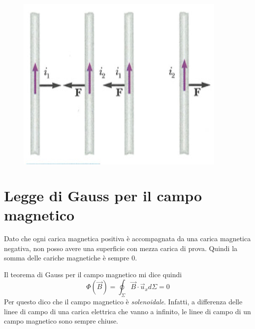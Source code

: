 \documentclass[class=book, crop=false, oneside, 12pt]{standalone}
\begin{document}
\begin{figure}[h]
    \includegraphics[scale=0.4]{int_cavi.png}
    \centering
    \caption{}
\end{figure}

\section{Legge di Gauss per il campo magnetico}

Dato che ogni carica magnetica positiva è accompagnata da una carica magnetica negativa, non posso avere una superficie con mezza carica di prova.
Quindi la somma delle cariche magnetiche è sempre \(0\).

Il teorema di Gauss per il campo magnetico mi dice quindi 
\begin{equation}
    \Phi \left(\overrightarrow{B}\right) = \oint_{\Sigma} \overrightarrow{B} \cdot \overrightarrow{u}_x d \Sigma = 0
\end{equation}
Per questo dico che il campo magnetico è \emph{solenoidale}.
Infatti, a differenza delle linee di campo di una carica elettrica che vanno a infinito, le linee di campo di un campo magnetico sono sempre chiuse.
\end{document}
